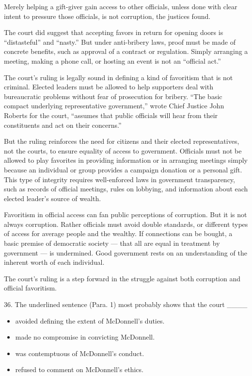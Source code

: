 \documentclass[UTF8,11pt]{ctexart}
\begin{document}
Merely helping a gift-giver gain access to other officials, unless done with clear intent to pressure those officials, is not corruption, the justices found.


The court did suggest that accepting favors in return for opening doors is “distasteful” and “nasty.” But under anti-bribery laws, proof must be made of concrete benefits, such as approval of a contract or regulation. Simply arranging a meeting, making a phone call, or hosting an event is not an “official act.”


The court’s ruling is legally sound in defining a kind of favoritism that is not criminal. Elected leaders must be allowed to help supporters deal with bureaucratic problems without fear of prosecution for bribery. “The basic compact underlying representative government,” wrote Chief Justice John Roberts for the court, “assumes that public officials will hear from their constituents and act on their concerns.”


But the ruling reinforces the need for citizens and their elected representatives, not the courts, to ensure equality of access to government. Officials must not be allowed to play favorites in providing information or in arranging meetings simply because an individual or group provides a campaign donation or a personal gift. This type of integrity requires well-enforced laws in government transparency, such as records of official meetings, rules on lobbying, and information about each elected leader’s source of wealth.


Favoritism in official access can fan public perceptions of corruption. But it is not always corruption. Rather officials must avoid double standards, or different types of access for average people and the wealthy. If connections can be bought, a basic premise of democratic society — that all are equal in treatment by government — is undermined. Good government rests on an understanding of the inherent worth of each individual.


The court’s ruling is a step forward in the struggle against both corruption and official favoritism.


36. The underlined sentence (Para. 1) most probably shows that the court \_\_\_\_


\begin{itemize}[leftmargin=2em,itemsep=.2em,topsep=.4em]\item[A.] avoided defining the extent of McDonnell’s duties.
\item[B.] made no compromise in convicting McDonnell.
\item[C.] was contemptuous of McDonnell’s conduct.
\item[D.] refused to comment on McDonnell’s ethics.
\end{itemize}
\end{document}
